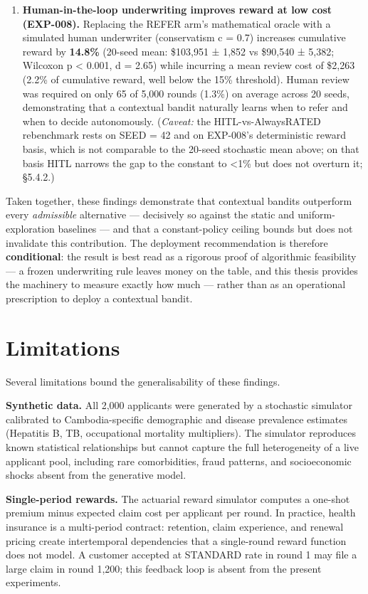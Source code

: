 \begin{enumerate}[label=\textbf{Finding \arabic*.}, leftmargin=*, itemsep=6pt]
\item \textbf{Human-in-the-loop underwriting improves reward at low cost (EXP-008).} Replacing the REFER arm's mathematical oracle with a simulated human underwriter (conservatism c = 0.7) increases cumulative reward by \textbf{14.8\%} (20-seed mean: \$103,951 ± 1,852 vs \$90,540 ± 5,382; Wilcoxon p \textless{} 0.001, d = 2.65) while incurring a mean review cost of \$2,263 (2.2\% of cumulative reward, well below the 15\% threshold). Human review was required on only 65 of 5,000 rounds (1.3\%) on average across 20 seeds, demonstrating that a contextual bandit naturally learns when to refer and when to decide autonomously. (\emph{Caveat:} the HITL-vs-AlwaysRATED rebenchmark rests on SEED = 42 and on EXP-008's deterministic reward basis, which is not comparable to the 20-seed stochastic mean above; on that basis HITL narrows the gap to the constant to \textless{}1\% but does not overturn it; §5.4.2.)
\end{enumerate}

Taken together, these findings demonstrate that contextual bandits outperform every \emph{admissible} alternative --- decisively so against the static and uniform-exploration baselines --- and that a constant-policy ceiling bounds but does not invalidate this contribution. The deployment recommendation is therefore \textbf{conditional}: the result is best read as a rigorous proof of algorithmic feasibility --- a frozen underwriting rule leaves money on the table, and this thesis provides the machinery to measure exactly how much --- rather than as an operational prescription to deploy a contextual bandit.

\section{Limitations}\label{limitations}

Several limitations bound the generalisability of these findings.

\textbf{Synthetic data.} All 2,000 applicants were generated by a stochastic simulator calibrated to Cambodia-specific demographic and disease prevalence estimates (Hepatitis B, TB, occupational mortality multipliers). The simulator reproduces known statistical relationships but cannot capture the full heterogeneity of a live applicant pool, including rare comorbidities, fraud patterns, and socioeconomic shocks absent from the generative model.

\textbf{Single-period rewards.} The actuarial reward simulator computes a one-shot premium minus expected claim cost per applicant per round. In practice, health insurance is a multi-period contract: retention, claim experience, and renewal pricing create intertemporal dependencies that a single-round reward function does not model. A customer accepted at STANDARD rate in round 1 may file a large claim in round 1,200; this feedback loop is absent from the present experiments.

